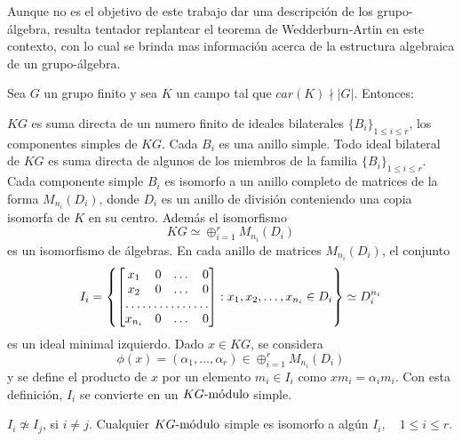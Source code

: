 Aunque no es el objetivo de este trabajo dar una descripción de los grupo-álgebra, resulta tentador replantear el teorema de Wedderburn-Artin en este contexto, con lo cual se brinda mas información acerca de la estructura algebraica de un grupo-álgebra.
\begin{teorema}\label{teo:wa}
Sea $G$ un grupo finito y sea $K$ un campo tal que $car(K) \nmid |G|$. Entonces:
\begin{bulletList}
\newItem $KG$ es suma directa de un numero finito de ideales bilaterales $\{B_i\}_{ 1 \leq i \leq r}$, los componentes simples de $KG$. Cada $B_i$ es una anillo simple.
\newItem Todo ideal bilateral de $KG$ es suma directa de algunos de los miembros de la familia $\{B_i\}_{ 1 \leq i \leq r}$.
\newItem Cada componente simple $B_i$ es isomorfo a un anillo completo de matrices de la forma $M_{n_i}(D_i)$, donde $D_i$ es un anillo de división conteniendo una copia isomorfa de $K$ en su centro. Además el isomorfismo
\[KG \simeq \oplus_{i=1}^{r} M_{n_i}(D_i) \]
es un isomorfismo de álgebras. 
\newItem En cada anillo de matrices $M_{n_i}(D_i)$, el conjunto
\[ I_i =  \left\{ \begin{bmatrix}
x_1 & 0 & \dots & 0 \\
x_2 & 0 & \dots & 0 \\
\hdotsfor{4} \\
x_{n_i} & 0 & \dots & 0 \\
\end{bmatrix} : x_1, x_2, \dots, x_{n_i} \in D_i \right\} \simeq D_i^{n_i} \] 
es un ideal minimal izquierdo. 
Dado $x \in KG$, se considera \[\phi (x) = (\alpha_1, \dots, \alpha_r) \in \oplus_{i=1}^r M_{n_i}(D_i)\] y se define el producto de $x$ por un elemento $m_i \in I_i$ como $xm_i = \alpha_im_i$. Con esta definición, $I_i$ se convierte en un $\modulo{KG}$ simple.

\newItem $I_i \not \simeq I_j$, si $ i \neq j$.
\newItem Cualquier $\modulo{KG}$  simple es isomorfo a algún $I_i, \quad 1 \leq i \leq r$. 
\end{bulletList}
\end{teorema}

